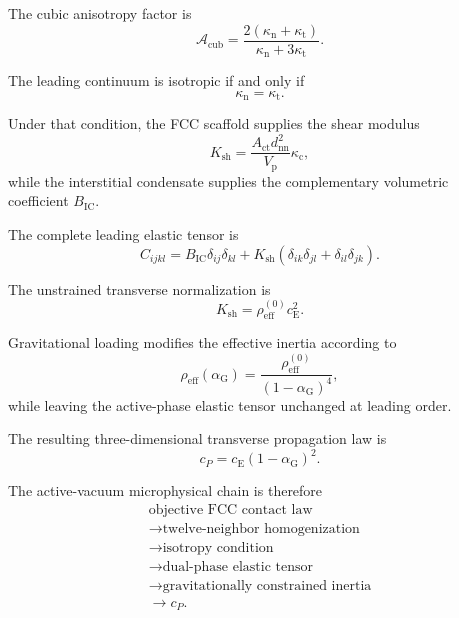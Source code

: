 The cubic anisotropy factor is
\begin{equation}
    \boxed{ \mathcal{A}_{\mathrm{cub}} = \frac{ 2 \left( \kappa_{\mathrm{n}} + \kappa_{\mathrm{t}} \right) }{ \kappa_{\mathrm{n}} + 3\kappa_{\mathrm{t}} }. }
\end{equation}

The leading continuum is isotropic if and only if
\begin{equation}
    \boxed{ \kappa_{\mathrm{n}} = \kappa_{\mathrm{t}}. }
\end{equation}

Under that condition, the FCC scaffold supplies the shear modulus
\begin{equation}
    \boxed{ K_{\mathrm{sh}} = \frac{ A_{\mathrm{ct}}d_{\mathrm{nn}}^2 }{ V_{\mathrm{p}} } \kappa_{\mathrm{c}}, }
\end{equation}
while the interstitial condensate supplies the complementary volumetric coefficient $B_{\mathrm{IC}}$.

The complete leading elastic tensor is
\begin{equation}
    \boxed{ C_{ijkl} = B_{\mathrm{IC}} \delta_{ij}\delta_{kl} + K_{\mathrm{sh}} \left( \delta_{ik}\delta_{jl} + \delta_{il}\delta_{jk} \right). }
\end{equation}

The unstrained transverse normalization is
\begin{equation}
    \boxed{ K_{\mathrm{sh}} = \rho_{\mathrm{eff}}^{(0)} c_{\mathrm{E}}^2. }
\end{equation}

Gravitational loading modifies the effective inertia according to
\begin{equation}
    \boxed{ \rho_{\mathrm{eff}} \left( \alpha_{\mathrm{G}} \right) = \frac{ \rho_{\mathrm{eff}}^{(0)} }{ \left( 1-\alpha_{\mathrm{G}} \right)^4 }, }
\end{equation}
while leaving the active-phase elastic tensor unchanged at leading order.

The resulting three-dimensional transverse propagation law is
\begin{equation}
    \boxed{ c_P = c_{\mathrm{E}} \left( 1-\alpha_{\mathrm{G}} \right)^2. }
\end{equation}

The active-vacuum microphysical chain is therefore
\begin{equation}
    \boxed{
    \begin{array}{c}
    \text{objective FCC contact law} \\
    \longrightarrow \text{twelve-neighbor homogenization} \\
    \longrightarrow \text{isotropy condition} \\
    \longrightarrow \text{dual-phase elastic tensor} \\
    \longrightarrow \text{gravitationally constrained inertia} \\
    \longrightarrow c_P.
    \end{array}
    }
\end{equation}

